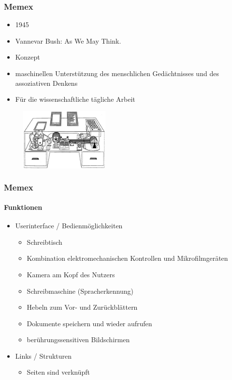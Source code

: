 \begin{frame}
\frametitle{Memex}
	\begin{itemize}
		\item 1945
		\item Vannevar Bush: As We May Think.
		\item Konzept
		\item maschinellen Unterstützung des menschlichen Gedächtnisses und des assoziativen Denkens
		\item Für die wissenschaftliche tägliche Arbeit
	\end{itemize}
	
	\begin{figure}[htbp]
		\centering
		\includegraphics[width=0.4\textwidth]{images/memex}
	\end{figure}

\end{frame}

\begin{frame}
	\frametitle{Memex}
	\framesubtitle{Funktionen}
	\begin{itemize}
		\item Userinterface / Bedienmöglichkeiten
		\begin{itemize}
			\item Schreibtisch
			\item Kombination elektromechanischen Kontrollen und Mikrofilmgeräten
			\item Kamera am Kopf des Nutzers 
			\item Schreibmaschine (Spracherkennung)
			\item Hebeln zum Vor- und Zurückblättern
			\item Dokumente speichern und wieder aufrufen
			\item berührungssensitiven Bildschirmen 
		\end{itemize}
		\item Links / Strukturen
		\begin{itemize}
			\item Seiten sind verknüpft
		\end{itemize}
	\end{itemize}
\end{frame}
